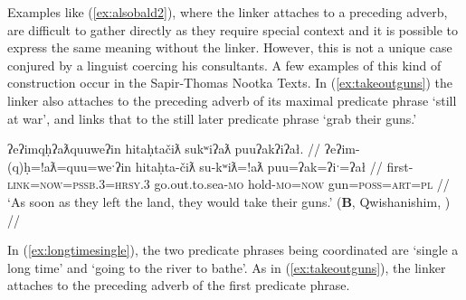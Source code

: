 Examples like (\ref{ex:alsobald2}), where the linker attaches to a preceding adverb, are difficult to gather directly as they require special context and it is possible to express the same meaning without the linker. However, this is not a unique case conjured by a linguist coercing his consultants. A few examples of this kind of construction occur in the Sapir-Thomas Nootka Texts. In (\ref{ex:takeoutguns}) the linker also attaches to the preceding adverb of its maximal predicate phrase `still at war', and links that to the still later predicate phrase `grab their guns.'

\ex \label{ex:takeoutguns}
\begingl
\glpreamble ʔeʔimqḥʔaƛquuweʔin hitaḥtačiƛ sukʷiʔaƛ puuʔakʔiʔał. //
\gla ʔeʔim-(q)ḥ=!aƛ=quu=weˑʔin hitaḥta-čiƛ su-kʷiƛ=!aƛ puu=ʔak=ʔiˑ=ʔał //
\glb first-\textsc{link}=\textsc{now}=\textsc{pssb.3}=\textsc{hrsy.3} go.out.to.sea-\textsc{mo} hold-\textsc{mo}=\textsc{now} gun=\textsc{poss}=\textsc{art}=\textsc{pl} //
\glft `As soon as they left the land, they would take their guns.' (\textbf{B}, Qwishanishim, \citealt[p.~395]{sapir1955}) //
\endgl
\xe

\begin{comment}
In (\ref{stillatwar}), the linker again attaches to an adverb \textit{ʔiiqḥii} `still', and links the entire predicate `still doing war' to the earlier predicate \textit{qʷis} `do thus.'

\ex \label{stillatwar}
\begingl
\glpreamble qiiḥsn̓aakck̓in ʔaḥ qʷiyiič qʷis, [ʔiiqḥii\textbf{qḥ} hitačink maatmaasʔi] [qaḥsaap̓aƛquuweʔin č̓amuʔałʔaƛquu yuułuʔiłʔatqḥ huuʕiiʔatḥuʔałʔaƛquu]]. //
\gla qiiḥsn̓aak-ck̓in ʔaḥ qʷiyi=(y)ii=č [[qʷis] [ʔiiqḥii-\textbf{(q)ḥ} hitačink maatmaas=ʔiˑ]] qaḥ-saˑp=!aƛ=quu=weˑʔin  č̓am-uʔał=!aƛ=quu yuułuʔiłʔatḥ-(q)ḥ huuʕiiʔatḥ-uʔał=!aƛ=quu. //
\glb long.time-\textsc{dim} \textsc{d1} when=\textsc{weak.3}=\textsc{hrsy} do.thus still-\text{link} go.against tribe.\textsc{pl}=\textsc{art} kill-\textsc{mo.caus}=\textsc{now}=\textsc{pssb.3}=\textsc{hrsy.3} canoe-see=\textsc{now}=\textsc{pssb.3} Ucluelet-\textsc{link} Huuayaht-see=\textsc{pssb.3}=\textsc{hrsy.3} //
\glft `For a little longer after this happened, while the tribes were still at war, the Ucluelets would kill Huu-ay-ahts when they saw their canoes.' (\textbf{B}, \citealt[p.~392]{sapir1955}) //
\endgl
\xe
\end{comment}

In (\ref{ex:longtimesingle}), the two predicate phrases being coordinated are `single a long time' and `going to the river to bathe'. As in (\ref{ex:takeoutguns}), the linker attaches to the preceding adverb of the first predicate phrase.

